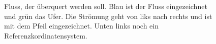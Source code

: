 \begin{figure}
\begin{tikzpicture}[x=0.75pt,y=0.75pt,yscale=-1,xscale=1]
    
    \end{tikzpicture}
    

    \caption{Fluss, der überquert werden soll. Blau ist der Fluss eingezeichnet und grün das Ufer. Die Strömung geht von liks nach rechts und ist mit dem Pfeil eingezeichnet. Unten links noch ein Referenzkordinatensystem.}
    \label{fig:river_points}
\end{figure}

